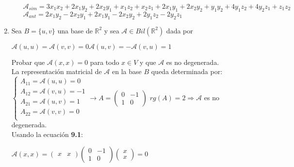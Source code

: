 \documentclass{article}
\newcommand{\R}{\mathbb{R}}
\newcommand{\A}{\mathcal{A}}
\newenvironment{tightcenter}{%
    \setlength\topsep{0pt}
    \setlength\parskip{0pt}
    \begin{center}
}{%
    \end{center}
}
\begin{document}
\begin{enumerate}
\begin{enumerate}
                    \begin{tightcenter}
                        $\A_{sim}=3x_1x_2+2x_1y_2+2x_2y_1+x_1z_2+x_2z_1+2x_1y_1+2x_2y_2+y_1y_2+4y_1z_2+4y_2z_1+z_1z_2$\\
                        $\A_{ant}=2x_1y_2-2x_2y_1+2x_1y_1-2x_2y_2+2y_1z_2-2y_2z_1$
                    \end{tightcenter}
            \end{enumerate}
        \item Sea $B=\{u,v\}$ una base de $\R^2$ y sea $\A\in Bil(\R^2)$ dada por
            \begin{center}
                $\A(u,u)=\A(v,v)=0$\quad$\A(u,v)=-\A(v,u)=1$
            \end{center}
            Probar que $\A(x,x)=0$ para todo $x\in V$ y que $\A$ es no degenerada.\\
            La representación matricial de $\A$ en la base $B$ queda determinada por:\\
            $\begin{cases} 
                A_{11}=\A(u,u)=0 \\
                A_{12}=\A(v,u)=-1 \\
                A_{21}=\A(u,v)=1 \\
                A_{22}=\A(v,v)=0 \\
            \end{cases}
            \to A=\begin{pmatrix}
                0 & -1 \\
                1 & 0 
            \end{pmatrix}$
            \quad $rg(A)=2\Rightarrow \A$ es no degenerada.\\
            Usando la ecuación \textbf{9.1}:
            \begin{tightcenter}
                $\A(x,x)=\begin{pmatrix}
                    x & x 
                \end{pmatrix}
                \begin{pmatrix}
                    0 & -1 \\
                    1 & 0 
                \end{pmatrix}
                \begin{pmatrix}
                    x \\
                    x 
                \end{pmatrix}=0$
            \end{tightcenter}

\end{enumerate}
\end{document}
